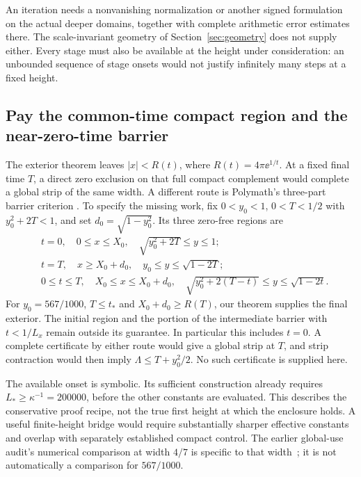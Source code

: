 An iteration needs a nonvanishing normalization or another signed
formulation on the actual deeper domains, together with complete
arithmetic error estimates there. The scale-invariant geometry of
Section~\ref{sec:geometry} does not supply either. Every stage must
also be available at the height under consideration: an unbounded
sequence of stage onsets would not justify infinitely many steps at
a fixed height.

\subsection{Pay the common-time compact region and the near-zero-time barrier}

The exterior theorem leaves $|x|<R(t)$, where $R(t)=4\pi\ee^{1/t}$.
At a fixed final time $T$, a direct zero exclusion on that full
compact complement would complete a global strip of the same width.
A different route is Polymath's three-part barrier criterion
\cite[Proposition 3.3]{Polymath}. To specify the missing work, fix
$0<y_0<1$, $0<T<1/2$ with $y_0^2+2T<1$, and set
$d_0=\sqrt{1-y_0^2}$. Its three zero-free regions are
\begin{align*}
 &t=0,\quad0\le x\le X_0,\quad
       \sqrt{y_0^2+2T}\le y\le1;\\
 &t=T,\quad x\ge X_0+d_0,\quad
       y_0\le y\le\sqrt{1-2T};\\
 &0\le t\le T,\quad X_0\le x\le X_0+d_0,\quad
       \sqrt{y_0^2+2(T-t)}\le y\le\sqrt{1-2t}.
\end{align*}
For $y_0=567/1000$, $T\le t_*$ and
$X_0+d_0\ge R(T)$, our theorem supplies the final exterior.
The initial region and the portion of the intermediate barrier with
$t<1/L_x$ remain outside its guarantee. In particular this includes
$t=0$. A complete certificate by either route would give a global
strip at $T$, and strip contraction would then imply
$\Lambda\le T+y_0^2/2$. No such certificate is supplied here.

The available onset is symbolic. Its sufficient construction already
requires $L_*\ge\kappa^{-1}=200000$, before the other constants are
evaluated. This describes the conservative proof recipe, not the true
first height at which the enclosure holds. A useful finite-height
bridge would require substantially sharper effective constants and
overlap with separately established compact control. The earlier
global-use audit's numerical comparison at width $4/7$ is specific
to that width~\cite{BB16}; it is not automatically a comparison for
$567/1000$.

